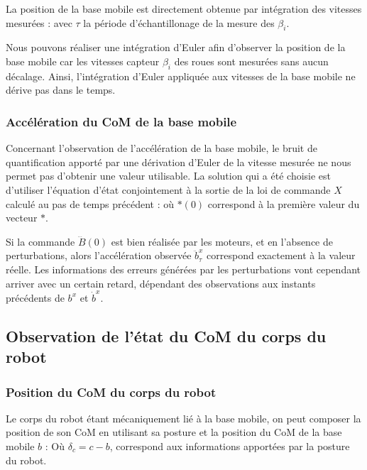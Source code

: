 				La position de la base mobile est directement obtenue par intégration des vitesses mesurées :
				avec $\tau$ la période d'échantillonage de la mesure des $\beta_i$.
				
				Nous pouvons réaliser une intégration d'Euler afin d'observer la position de la base mobile car les vitesses capteur $\beta_i$ des roues sont mesurées sans aucun décalage.
				Ainsi, l'intégration d'Euler appliquée aux vitesses de la base mobile ne dérive pas dans le temps.
				
			\subsubsection{Accélération du CoM de la base mobile}
			\label{section.observation_acc_base}
				Concernant l'observation de l'accélération de la base mobile, le bruit de quantification apporté par une dérivation d'Euler de la vitesse mesurée ne nous permet pas d'obtenir une valeur utilisable.
				La solution qui a été choisie est d'utiliser l'équation d'état  conjointement à la sortie de la loi de commande $X$ calculé au pas de temps précédent :
				où $*(0)$ correspond à la première valeur du vecteur $*$.
				
				Si la commande $\dddot{B}(0)$ est bien réalisée par les moteurs, et en l'absence de perturbations, alors l'accélération observée $\ddot{b}^x_\tau$ correspond exactement à la valeur réelle.
				Les informations des erreurs générées par les perturbations vont cependant arriver avec un certain retard, dépendant des observations aux instants précédents de $b^x$ et $\dot{b}^x$.
				
		\subsection{Observation de l'état du CoM du corps du robot}
			\subsubsection{Position du CoM du corps du robot}
			
				Le corps du robot étant mécaniquement lié à la base mobile, on peut composer la position de son CoM en utilisant sa posture et la position du CoM de la base mobile $b$ :
				Où $\delta_c = c-b$, correspond aux informations apportées par la posture du robot.
				
